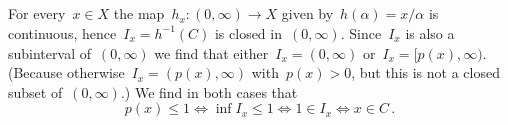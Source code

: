 \subsection{}

For every~$x \in X$ the map~$h_x \colon (0,\infty) \to X$ given by~$h(\alpha) = x/\alpha$ is continuous, hence~$I_x = h^{-1}(C)$ is closed in~$(0,\infty)$.
Since~$I_x$ is also a subinterval of~$(0,\infty)$ we find that either~$I_x = (0,\infty)$ or~$I_x = [p(x), \infty)$.
(Because otherwise~$I_x = (p(x), \infty)$ with~$p(x) > 0$, but this is not a closed subset of~$(0,\infty)$.)
We find in both cases that
\[
        p(x) \leq 1
  \iff  \inf I_x \leq 1
  \iff  1 \in I_x
  \iff  x \in C \,.
\]




